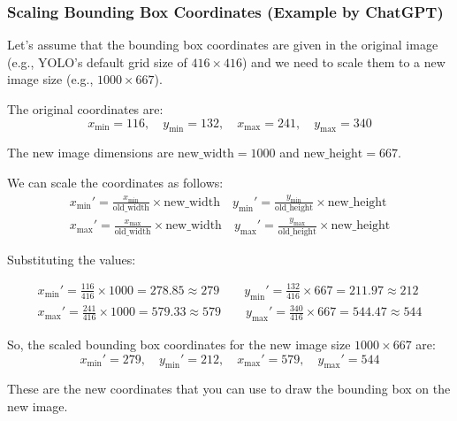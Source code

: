 \subsubsection{Scaling Bounding Box Coordinates \small{(Example by ChatGPT)}}

    Let's assume that the bounding box coordinates are given in the original image (e.g., YOLO's default grid size of \( 416 \times 416 \)) and we need to scale them to a new image size (e.g., \( 1000 \times 667 \)).

\noindent
The original coordinates are:
\[
x_{\text{min}} = 116, \quad y_{\text{min}} = 132, \quad x_{\text{max}} = 241, \quad y_{\text{max}} = 340
\]

\noindent
The new image dimensions are \( \text{new\_width} = 1000 \) and \( \text{new\_height} = 667 \).

\noindent
We can scale the coordinates as follows:
\begin{align*}
    x_{\text{min}}' = \frac{x_{\text{min}}}{\text{old\_width}} \times \text{new\_width} \quad 
    y_{\text{min}}' = \frac{y_{\text{min}}}{\text{old\_height}} \times \text{new\_height}\\
    x_{\text{max}}' = \frac{x_{\text{max}}}{\text{old\_width}} \times \text{new\_width} \quad 
    y_{\text{max}}' = \frac{y_{\text{max}}}{\text{old\_height}} \times \text{new\_height}
\end{align*}


\noindent
Substituting the values:

\begin{align*}
    x_{\text{min}}' = \frac{116}{416} \times 1000 = 278.85 \approx 279 \qquad
    y_{\text{min}}' = \frac{132}{416} \times 667 = 211.97 \approx 212\\
    x_{\text{max}}' = \frac{241}{416} \times 1000 = 579.33 \approx 579 \qquad
    y_{\text{max}}' = \frac{340}{416} \times 667 = 544.47 \approx 544
\end{align*}


\noindent
So, the scaled bounding box coordinates for the new image size \( 1000 \times 667 \) are:
\[
x_{\text{min}}' = 279, \quad y_{\text{min}}' = 212, \quad x_{\text{max}}' = 579, \quad y_{\text{max}}' = 544
\]

\noindent
These are the new coordinates that you can use to draw the bounding box on the new image.

